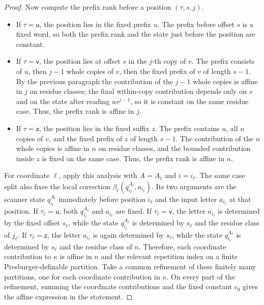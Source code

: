 \documentclass[11pt]{article}
\theoremstyle{definition}
\begin{document}
\begin{proof}
Now compute the prefix rank before a position $(\tau,s,j)$.
\begin{itemize}
\item If $\tau=\mathsf u$, the position lies in the fixed prefix $u$.  The
prefix before offset $s$ is a fixed word, so both the prefix rank and the state
just before the position are constant.
\item If $\tau=\mathsf v$, the position lies at offset $s$ in the $j$-th copy
of $v$.  The prefix consists of $u$, then $j-1$ whole copies of $v$, then the
fixed prefix of $v$ of length $s-1$.  By the previous paragraph the contribution
of the $j-1$ whole copies is affine in $j$ on residue classes; the final
within-copy contribution depends only on $s$ and on the state after reading
$uv^{j-1}$, so it is constant on the same residue case.  Thus, the prefix rank
is affine in $j$.
\item If $\tau=\mathsf z$, the position lies in the fixed suffix $z$.  The
prefix contains $u$, all $n$ copies of $v$, and the fixed prefix of $z$ of
length $s-1$.  The contribution of the $n$ whole copies is affine in $n$ on
residue classes, and the bounded contribution inside $z$ is fixed on the same
case.  Thus, the prefix rank is affine in $n$.
\end{itemize}

For coordinate $\ell$, apply this analysis with $A=A_\ell$ and $i=i_\ell$.
The same case split also fixes the local correction
$\beta_\ell(q^{A_\ell}_{i_\ell},a_{i_\ell})$.  Its two arguments are the
scanner state $q^{A_\ell}_{i_\ell}$ immediately before position $i_\ell$ and
the input letter $a_{i_\ell}$ at that position.  If
$\tau_\ell=\mathsf u$, both $q^{A_\ell}_{i_\ell}$ and $a_{i_\ell}$ are fixed.
If $\tau_\ell=\mathsf v$, the letter $a_{i_\ell}$ is determined by the fixed
offset $s_\ell$, while the state $q^{A_\ell}_{i_\ell}$ is determined by
$s_\ell$ and the residue class of $j_\ell$.  If
$\tau_\ell=\mathsf z$, the letter $a_{i_\ell}$ is again determined by
$s_\ell$, while the state $q^{A_\ell}_{i_\ell}$ is determined by $s_\ell$ and
the residue class of $n$.
Therefore, each coordinate contribution to $\kappa$ is affine in $n$ and the
relevant repetition index on a finite Presburger-definable partition.  Take a
common refinement of these finitely many partitions, one for each coordinate
contribution in $\kappa$.  On every part of the refinement, summing the
coordinate contributions and the fixed constant $c_0$ gives the affine
expression in the statement.
\end{proof}
\end{document}
